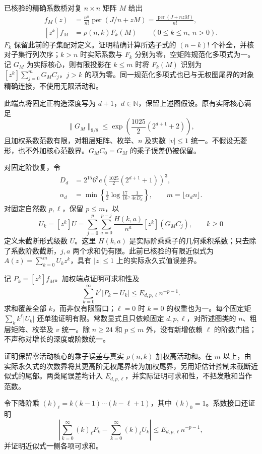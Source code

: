 \documentclass[UTF8,11pt,fontset=fandol]{ctexart}
\begin{document}
已核验的精确系数桥对复 $n\times n$ 矩阵 $M$ 给出
\[
 \begin{aligned}
 f_M(z)&=\frac{n^n}{n!}\operatorname{per}(J/n+zM)
       =\frac{\operatorname{per}(J+nzM)}{n!},\\
 [z^k]f_M&=\rho(n,k)F_k(M)\qquad(0\le k\le n,\ n>0).
 \end{aligned}
\]
$F_k$ 保留此前的子集配对定义。证明精确计算所选子式的 $(n-k)!$ 个补全，并核对子集行列次序；$k>n$ 时实际系数与 $F_k$ 分别为零，空矩阵规范化多项式为一。记 $G_M$ 为实际核心，则有限投影在 $k\le m$ 时将 $F_k(M)$ 识别为 $[z^k]\sum_{j=0}^{m}G_MC_j$，$j>k$ 的项为零。同一规范化多项式也已与无权图尾界的对象精确连接，不使用无限活动和。

此端点将固定正构造深度写为 $d+1$，$d\in\mathbb N$，保留上述图假设。原有实际核心满足
\[
 \|G_M\|_{9/8}\le\exp\!\left(\frac{1025}{2}(2^{d+1}+2)\right),
\]
且加权系数范数有限，对粗层矩阵、枚举、$n$ 及实数 $|v|\le1$ 统一。不假设无菱形，也不外加核心范数界。$G_MC_0=G_M$ 的乘子误差仍被保留。

对固定阶恢复，令
\[
 \begin{aligned}
 D_d&=2^{15}6^3e\left(\frac{1025}{2}(2^{d+1}+1)\right)^3,\\
 \alpha_d&=\min\!\left\{\frac12\log\frac{17}{16},\frac1{4eD_d}\right\},
 \qquad m=\lfloor\alpha_dn\rfloor.
 \end{aligned}
\]
对固定自然数 $p,\ell$，保留 $p\le m$，以
\[
 U_k=[z^k]U=\sum_{j=0}^{p}\sum_{a=0}^{p-j}
 \frac{H(k,a)}{n^a}[z^k](G_MC_j),\qquad k\ge0
\]
定义未截断形式级数 $U$。这里 $H(k,a)$ 是实际阶乘乘子的几何乘积系数；只去除了系数阶数截断，$j,a$ 两个求和仍有限。此前已核验的有限近似式为 $A(z)=\sum_{k=0}^{m}U_kz^k$，具有 $|z|\le1$ 上的实际永久式值误差界。

记 $P_k=[z^k]f_M$。加权端点证明可求和性及
\[
 \sum_{k=0}^{\infty}k^\ell\lvert P_k-U_k\rvert
 \le E_{d,p,\ell}n^{-p-1}.
\]
求和覆盖全部 $k$，而非仅有限窗口；$\ell=0$ 时 $k=0$ 的权重也为一。每个固定矩 $\sum_k k^\ell|U_k|$ 还单独证明有限。常数显式且只依赖固定 $d,p,\ell$，对所述图类的 $n$、粗层矩阵、枚举及 $v$ 统一。除 $n\ge24$ 和 $p\le m$ 外，没有新增依赖 $\ell$ 的阶数门槛；不声称对增长的深度或阶数统一。

证明保留零活动核心的乘子误差与真实 $\rho(n,k)$ 加权高活动和。在 $m$ 以上，由实际永久式的次数界将其更高阶无权尾界转为加权尾界，另用矩估计控制未截断近似式的尾部。两类尾误差均计入 $E_{d,p,\ell}$，并实际证明可求和性，不把发散和当作范数。

令下降阶乘 $(k)_\ell=k(k-1)\cdots(k-\ell+1)$，其中 $(k)_0=1$。系数接口还证明
\[
 \left|\sum_{k=0}^{\infty}(k)_\ell P_k
       -\sum_{k=0}^{\infty}(k)_\ell U_k\right|
 \le E_{d,p,\ell}n^{-p-1},
\]
并证明近似式一侧各项可求和。
\end{document}
